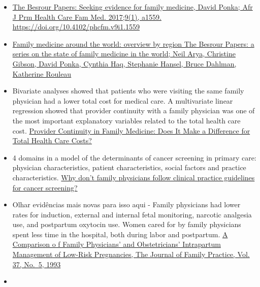 \documentclass[]{book}
\begin{document}
\begin{itemize}
\item
  \href{https://phcfm.org/index.php/phcfm/article/view/1559/2228}{The Besrour Papers: Seeking evidence for family medicine, David Ponka; Afr J Prm Health Care Fam Med. 2017;9(1), a1559. https://doi.org/10.4102/phcfm.v9i1.1559}
\item
  \href{https://www.ncbi.nlm.nih.gov/pmc/articles/PMC5471080/pdf/0630436.pdf}{Family medicine around the world: overview by region The Besrour Papers: a series on the state of family medicine in the world; Neil Arya, Christine Gibson, David Ponka, Cynthia Haq, Stephanie Hansel, Bruce Dahlman, Katherine Rouleau}
\item
  Bivariate analyses showed that patients who were visiting the same family physician had a lower total cost for medical care. A multivariate linear regression showed that provider continuity with a family physician was one of the most important explanatory variables related to the total health care cost. \href{https://www.ncbi.nlm.nih.gov/pmc/articles/PMC1466579/pdf/0010144.pdf}{Provider Continuity in Family Medicine: Does It Make a Difference for Total Health Care Costs?}
\item
  4 domains in a model of the determinants of cancer screening in primary care: physician characteristics, patient characteristics, social factors and practice characteristics. \href{https://www.ncbi.nlm.nih.gov/pmc/articles/PMC1232738/pdf/cmaj_159_7_797.pdf}{Why don't family physicians follow clinical practice guidelines for cancer screening?}
\item
  Olhar evidências mais novas para isso aqui - Family physicians had lower rates for induction, external and internal fetal monitoring, narcotic analgesia use, and postpartum oxytocin use. Women cared for by family physicians spent less time in the hospital, both during labor and postpartum. \href{https://mdedge-files-live.s3.us-east-2.amazonaws.com/files/s3fs-public/jfp-archived-issues/1993-volume_36-37/JFP_1993-11_v37_i5_a-comparison-of-family-physicians-and-o.pdf}{A Comparison o f Family Physicians' and Obstetricians' Intrapartum Management of Low-Risk Pregnancies, The Journal of Family Practice, Vol. 37, No.~5, 1993}
\item

\end{itemize}
\end{document}
